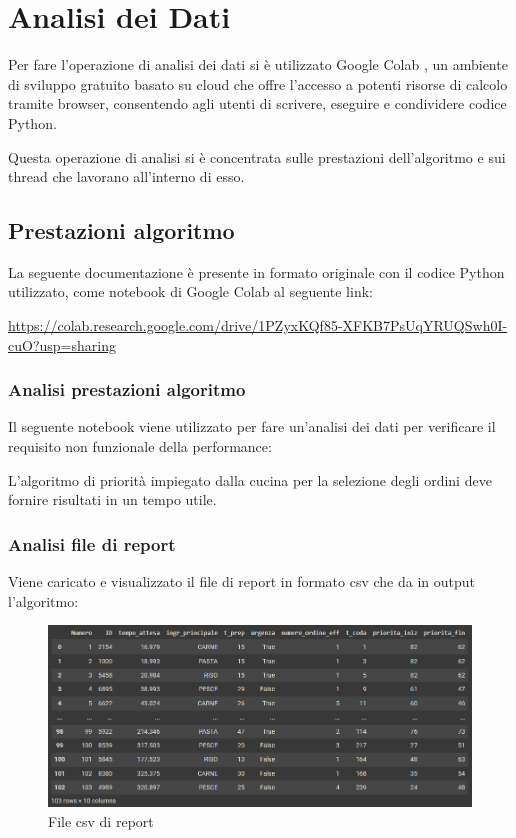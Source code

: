 \section{Analisi dei Dati}

Per fare l'operazione di analisi dei dati si è utilizzato Google Colab \cite{googlecolab}, un ambiente di sviluppo gratuito basato su cloud che offre l'accesso a potenti risorse di calcolo tramite browser, consentendo agli utenti di scrivere, eseguire e condividere codice Python.

Questa operazione di analisi si è concentrata sulle prestazioni dell'algoritmo e sui thread che lavorano all'interno di esso.

\subsection{Prestazioni algoritmo}
La seguente documentazione è presente in formato originale con il codice Python utilizzato, come notebook di Google Colab al seguente link:

{\footnotesize \href{https://colab.research.google.com/drive/1PZyxKQf85-XFKB7PsUqYRUQSwh0I-cuO?usp=sharing}{https://colab.research.google.com/drive/1PZyxKQf85-XFKB7PsUqYRUQSwh0I-cuO?usp=sharing}}

\subsubsection{Analisi prestazioni algoritmo}
Il seguente notebook viene utilizzato per fare un'analisi dei dati per verificare il requisito non funzionale della performance:

L’algoritmo di priorità impiegato dalla cucina per la selezione degli ordini deve fornire risultati in un tempo utile.

\subsubsection{Analisi file di report}
Viene caricato e visualizzato il file di report in formato csv che da in output l'algoritmo:

\begin{figure}[H]
	\centering
	\includegraphics[scale=0.6]{iterazione3/images/datasetcsv.png}
	\caption{File csv di report\label{fig:report-csv}}
\end{figure}

